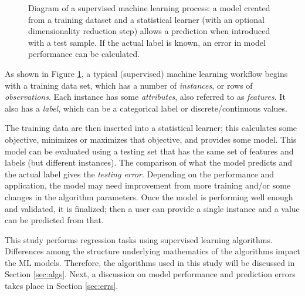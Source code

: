 \begin{figure}[!htb]
  \caption{Diagram of a supervised machine learning process: a model 
           created from a training dataset and a statistical learner (with
           an optional dimensionality reduction step) allows a prediction
           when introduced with a test sample. If the actual label is known,
           an error in model performance can be calculated.}
  \label{fig:supervised}
\end{figure}

As shown in Figure \ref{fig:supervised}, a typical (supervised) machine
learning workflow begins with a training data set, which has a number of
\textit{instances}, or rows of \textit{observations}.  Each instance has some
\textit{attributes}, also referred to as \textit{features}. It also has a
\textit{label}, which can be a categorical label or discrete/continuous values.  

The training data are then inserted into a statistical learner; this calculates
some objective, minimizes or maximizes that objective, and provides some model.
This model can be evaluated using a testing set that has the same set of
features and labels (but different instances). The comparison of what the
model predicts and the actual label gives the \textit{testing error}.
Depending on the performance and application, the model may need improvement
from more training and/or some changes in the algorithm parameters. Once the
model is performing well enough and validated, it is finalized; then a user can
provide a single instance and a value can be predicted from that. 

This study performs regression tasks using supervised learning algorithms.
Differences among the structure underlying mathematics of the algorithms impact the
\gls{ML} models.  Therefore, the algorithms used in this study will be discussed
in Section \ref{sec:algs}. Next, a discussion on model performance and prediction 
errors takes place in Section \ref{sec:errs}.

